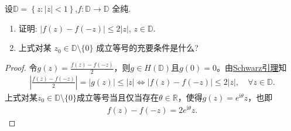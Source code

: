 \documentclass[../../main.tex]{subfiles}%
\begin{document}
\begin{example}
设$\mathbb{D} =\left\{ z:\left| z \right|<1 \right\}$,$f:\mathbb{D}\to\mathbb{D}$ 全纯.
\begin{enumerate}[(1)]
\item 证明: $|f(z)-f(-z)|\leqslant 2|z|$, $z\in\mathbb{D}$.
\item 上式对某 $z_0\in\mathbb{D}\setminus\{0\}$ 成立等号的充要条件是什么?
\end{enumerate}
\end{example}
\begin{proof}
令$g(z)=\frac{f(z)-f(-z)}{2}$，则$g\in H(\mathbb{D})$且$g(0)=0$。由\hyperref[theorem:Schwarz引理-定理4.5.3]{Schwarz引理}知
\begin{align*}
\left|\frac{f(z)-f(-z)}{2}\right|=|g(z)|\leqslant |z|\Longleftrightarrow |f(z)-f(-z)|\leqslant 2|z|,\quad \forall z\in\mathbb{D}.
\end{align*}
上式对某$z_0\in\mathbb{D}\setminus\{0\}$成立等号当且仅当存在$\theta\in\mathbb{R}$，使得$g(z)=e^{\mathrm{i}\theta}z$，也即
\begin{align*}
f(z)-f(-z)=2e^{\mathrm{i}\theta}z.
\end{align*}
\end{proof}
\end{document}
